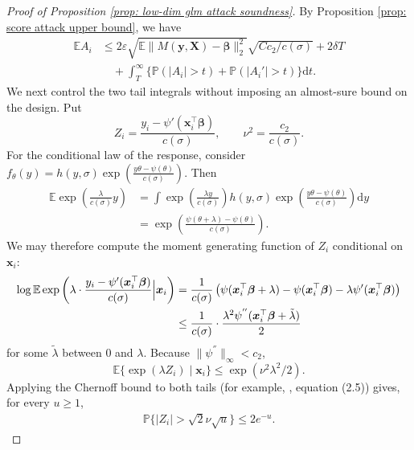 \documentclass[letterpaper,12pt]{article}
\renewcommand{\d}{\mathrm{d}}
\numberwithin{equation}{section}
\theoremstyle{plain}
\numberwithin{Theorem}{section}
\numberwithin{proposition}{section}
\numberwithin{Lemma}{section}
{
	\theoremstyle{definition}
	\newtheorem{Definition}{Definition}
	\newtheorem{example}{Example}
	\numberwithin{example}{section}
	\newtheorem{fact}{Fact}
	\numberwithin{fact}{section}
	\newtheorem{remark}{Remark}
}
\newcommand{\Pro}{\mathbb{P}}
\newcommand{\1}{\mathbbm{1}}
\def\bbeta{{\boldsymbol{\beta}}}
\def\E{\mathbb{E}}
\begin{document}
\begin{proof}[Proof of Proposition \ref{prop: low-dim glm attack soundness}]
		By Proposition \ref{prop: score attack upper bound}, we have
		\begin{align*}
			\E A_i &\leq 2\varepsilon \sqrt{\E\|M(\bm y, \bm X) - \bbeta\|^2_2} \sqrt{Cc_2/c(\sigma)} +  2\delta T \\
			&\quad+ \int_T^\infty \{\Pro(|A_i| > t)+\Pro(|A_i'|>t)\} \d t.
		\end{align*}
		We next control the two tail integrals without imposing an almost-sure
		bound on the design. Put
		\[
			Z_i=\frac{y_i-\psi'(\bm x_i^\top\bbeta)}{c(\sigma)},
			\qquad \nu^2=\frac{c_2}{c(\sigma)}.
		\]
		For the conditional law of the response, consider
		$f_{\theta}(y) = h(y, \sigma)\exp\left(\frac{y\theta - \psi(\theta)}{c(\sigma)}\right)$. Then
		\begin{align*}
			\E \exp\left(\frac{\lambda}{c(\sigma)} y\right)
		&= \int \exp\left(\frac{\lambda y}{c(\sigma)} \right)  h(y, \sigma)
		\exp\left(\frac{y\theta - \psi(\theta)}{c(\sigma)}\right) \d y\\
		&= \exp\left(\frac{\psi(\theta + \lambda) - \psi(\theta)}{c(\sigma)}\right).
	\end{align*}
		We may therefore compute the moment generating function of $Z_i$ conditional on $\bm x_i$:
	\begin{align}\label{eq: glm mgf upper bound}
		\log \E \exp\left(\lambda 
		\cdot \frac{y_i - \psi'(\bm x_i^\top\bbeta)}{c(\sigma)}\Big| \bm x_i\right) &= \frac{1}{c(\sigma)}\left(\psi(\bm x_i^\top\bbeta + \lambda) - \psi(\bm x_i^\top\bbeta) - \lambda\psi'(\bm x_i^\top\bbeta)\right) \notag \\
		&\leq \frac{1}{c(\sigma)} \cdot \frac{\lambda^2 \psi^{''}(\bm x_i^\top\bbeta + \tilde \lambda)}{2}
	\end{align}
			for some $\tilde \lambda$ between $0$ and $\lambda$. Because
			$\|\psi^{''}\|_\infty<c_2$,
			\[
				\E\{\exp(\lambda Z_i)\mid\bm x_i\}
				\leq\exp(\nu^2\lambda^2/2).
			\]
			Applying the Chernoff bound to both tails (for example,
			\cite{wainwright2019high}, equation (2.5)) gives, for every
			$u\geq1$,
			\begin{align}\label{eq: low-dim residual tail}
				\Pro\{|Z_i|>\sqrt{2}\nu\sqrt u\}\leq2e^{-u}.
			\end{align}


\end{proof}
\end{document}
